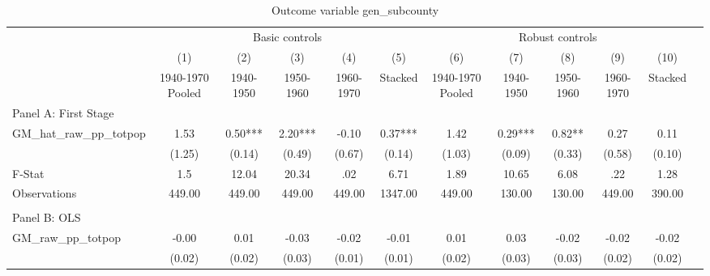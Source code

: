  \begin{table}[htbp]\centering {} \begin{threeparttable} \caption{Outcome variable gen\_subcounty } \begin{tabular}{l*{11}{c}} \toprule
          &\multicolumn{5}{c}{Basic controls}                                   &\multicolumn{5}{c}{Robust controls}                                  \\\cmidrule(lr){2-6}\cmidrule(lr){7-11}
          &\multicolumn{1}{c}{(1)}&\multicolumn{1}{c}{(2)}&\multicolumn{1}{c}{(3)}&\multicolumn{1}{c}{(4)}&\multicolumn{1}{c}{(5)}&\multicolumn{1}{c}{(6)}&\multicolumn{1}{c}{(7)}&\multicolumn{1}{c}{(8)}&\multicolumn{1}{c}{(9)}&\multicolumn{1}{c}{(10)}\\
          &\multicolumn{1}{c}{1940-1970 Pooled}&\multicolumn{1}{c}{1940-1950}&\multicolumn{1}{c}{1950-1960}&\multicolumn{1}{c}{1960-1970}&\multicolumn{1}{c}{Stacked}&\multicolumn{1}{c}{1940-1970 Pooled}&\multicolumn{1}{c}{1940-1950}&\multicolumn{1}{c}{1950-1960}&\multicolumn{1}{c}{1960-1970}&\multicolumn{1}{c}{Stacked}\\
\cmidrule(lr){1-11}
\multicolumn{10}{l}{Panel A: First Stage}\\
\cmidrule(lr){1-11}
GM\_hat\_raw\_pp\_totpop&      1.53   &      0.50***&      2.20***&     -0.10   &      0.37***&      1.42   &      0.29***&      0.82** &      0.27   &      0.11   \\
          &    (1.25)   &    (0.14)   &    (0.49)   &    (0.67)   &    (0.14)   &    (1.03)   &    (0.09)   &    (0.33)   &    (0.58)   &    (0.10)   \\
\midrule
F-Stat    &       1.5   &     12.04   &     20.34   &       .02   &      6.71   &      1.89   &     10.65   &      6.08   &       .22   &      1.28   \\
Observations&    449.00   &    449.00   &    449.00   &    449.00   &   1347.00   &    449.00   &    130.00   &    130.00   &    449.00   &    390.00   \\
\cmidrule[\heavyrulewidth](lr){1-11} \\ \cmidrule[\heavyrulewidth](lr){1-11}
\multicolumn{10}{l}{Panel B: OLS}\\
\cmidrule(lr){1-11}
GM\_raw\_pp\_totpop&     -0.00   &      0.01   &     -0.03   &     -0.02   &     -0.01   &      0.01   &      0.03   &     -0.02   &     -0.02   &     -0.02   \\
          &    (0.02)   &    (0.02)   &    (0.03)   &    (0.01)   &    (0.01)   &    (0.02)   &    (0.03)   &    (0.03)   &    (0.02)   &    (0.02)   \\

\end{tabular}
\end{threeparttable}
\end{table}
